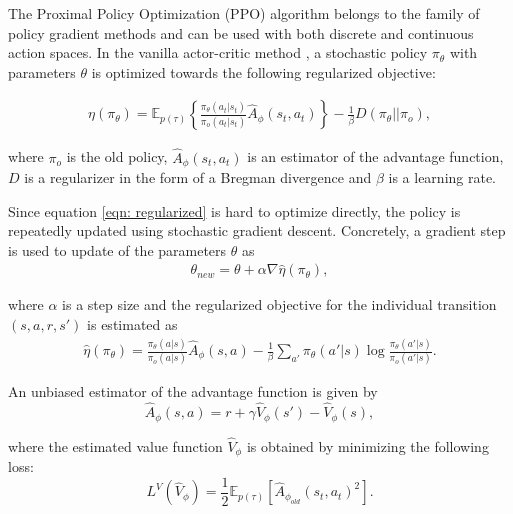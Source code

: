 \documentclass{article}
\begin{document}
    The Proximal Policy Optimization (PPO) algorithm \cite{Schulman2017} belongs to the family of policy gradient methods and can be used with both discrete and continuous action spaces. In the vanilla actor-critic method \cite{sutton2000policy}, a stochastic policy $\pi_\theta$ with parameters $\theta$ is optimized towards the following regularized objective:
    
    \begin{gather}
        \eta(\pi_\theta)  = \mathbb{E}_{p(\tau)}\left\lbrace 
        \frac{\pi_\theta(a_t \rvert s_t)}{\pi_o(a_t \rvert s_t  )} \hat{A}_{\phi}(s_t,a_t)\right\rbrace  - \frac{1}{\beta}  
        D( \pi_\theta \rvert \rvert \pi_o) ,\label{eqn: regularized}
    \end{gather}

	\noindent
	where $\pi_o$ is the old policy, $\hat{A}_{\phi}(s_t,a_t)$ is an estimator of the advantage function, $D$ is a regularizer in the form of a Bregman divergence and $\beta$ is a learning rate.
    
	Since equation \eqref{eqn: regularized} is hard to optimize directly, the policy is repeatedly updated using stochastic gradient descent. Concretely, a gradient step is used to update of the parameters $\theta$ as
    \begin{gather}
    \theta_{new} = \theta + \alpha \nabla \hat{\eta}(\pi_{\theta}),\label{eqn: thetaupdatesgrad}
    \end{gather}
    
	\noindent
    where $\alpha$ is a step size and the regularized objective for the individual transition $(s,a,r,s')$ is estimated as
	\begin{gather}
        \hat{\eta}(\pi_\theta)  =  \frac{\pi_\theta(a \rvert s)}{\pi_o(a \rvert s )} \hat{A}_{\phi}(s,a)  - \frac{1}{\beta}  
        \sum_{a'} \pi_\theta(a'|s) \log \frac {\pi_\theta(a'|s)} {\pi_o(a'|s)}. \label{eqn: regularized2}
    \end{gather}

	An unbiased estimator of the advantage function is given by 
    \begin{equation}
    \hat{A}_{\phi}(s,a) =  r + \gamma \hat{V}_{\phi} (s') - \hat{V}_{\phi}(s), \label{eqn: advantage}
    \end{equation}
    
	\noindent
    where the estimated value function $\hat{V}_{\phi}$ is obtained by minimizing the following loss:
    \begin{equation}
        L^V(\hat{V}_{\phi}) = \frac{1}{2} \mathbb{E}_{p(\tau)} [ \hat{A}_{\phi_{old}}(s_t, a_t)^2].
    \end{equation}
\end{document}
